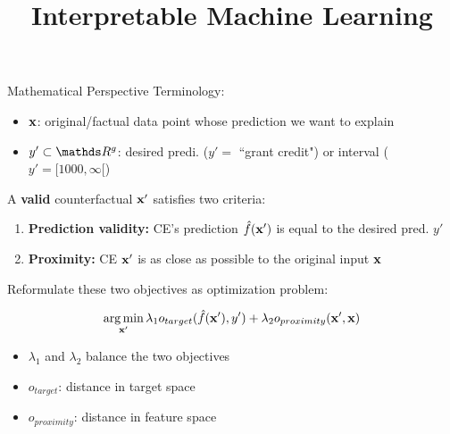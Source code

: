 \documentclass[10pt,compress,t,notes=noshow, xcolor=table]{beamer}
\title{Interpretable Machine Learning}
\date{}
\begin{document}







\begin{frame}{Mathematical Perspective}
    Terminology:
    \begin{itemize}
        \item $\mathbf{x}$: original/factual data point whose prediction we want to explain
        \item $y' \subset \R^g$: desired predi. ($y' =$ ``grant credit") or interval ($y' = [1000, \infty[$)
    \end{itemize}
    \lz\pause
    A \textbf{valid} counterfactual $\mathbf{x}'$ satisfies two criteria:
    \begin{enumerate}
    \item \textbf{Prediction validity:} CE's prediction $\hat{f}(\mathbf{x}')$ is equal to the desired pred. $y'$ 
\item \textbf{Proximity:} CE $\mathbf{x}'$ is as close as possible to the original input $\mathbf{x}$
	\end{enumerate}
	\lz\pause
	Reformulate these two objectives as optimization problem: %
	
$$\mathop{\mathrm{arg\,min}}_{\mathbf{x}'} \lambda_1 o_{target}(\hat{f}(\mathbf{x}'), y') + \lambda_2 o_{proximity}(\mathbf{x}', \mathbf{x})$$

	\begin{itemize}
		\item $\lambda_1$ and $\lambda_2$ balance the two objectives
          \item $o_{target}$: distance in target space %
          \item $o_{proximity}$: distance in feature space %
	\end{itemize}
\end{frame}
\end{document}
